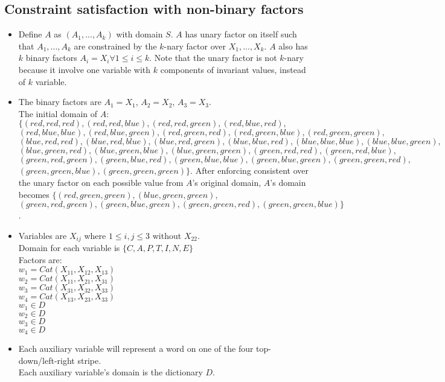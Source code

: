 \documentclass[11pt]{article}
\begin{document}
\begin{onehalfspace}
\section{Constraint satisfaction with non-binary factors}
\begin{itemize}
	\item
	Define $A$ as $(A_1,...,A_k)$ with domain $S$. $A$ has unary factor on itself such that $A_1,...,A_k$ are constrained by the $k$-nary factor over $X_1,...,X_k$. $A$ also has $k$ binary factors $A_i = X_i \forall 1 \leq i \leq k$. Note that the unary factor is not $k$-nary because it involve one variable with $k$ components of invariant values, instead of $k$ variable.\\
	\item
	 The binary factors are $A_1 = X_1$, $A_2 = X_2$, $A_3 = X_3$.\\
	 The initial domain of $A$: $\{(red,red,red),(red,red,blue),(red,red,green),(red,blue,red),$\\$(red,blue,blue),(red,blue,green),(red,green,red),(red,green,blue),(red,green,green),$\\$(blue,red,red),(blue,red,blue),(blue,red,green),(blue,blue,red),(blue,blue,blue),(blue,blue,green),$\\$(blue,green,red),(blue,green,blue),(blue,green,green),(green,red,red),(green,red,blue),$\\$(green,red,green),(green,blue,red),(green,blue,blue),(green,blue,green),(green,green,red),$\\$(green,green,blue),(green,green,green)\}$.
	 After enforcing consistent over the unary factor on each possible value from $A$'s original domain, $A$'s domain becomes $\{(red,green,green),(blue,green,green),$\\$(green,red,green),(green,blue,green),(green,green,red),(green,green,blue)\}$.
	 \item
	 Variables are $X_{ij}$ where $1 \leq i,j \leq 3$ without $X_{22}$.\\
	 Domain for each variable is $\{C,A,P,T,I,N,E\}$\\
	 Factors are:\\
	 $w_1 = Cat(X_{11},X_{12},X_{13})$\\
	 $w_2 = Cat(X_{11},X_{21},X_{31})$\\
	 $w_3 = Cat(X_{31},X_{32},X_{33})$\\
	 $w_4 = Cat(X_{13},X_{23},X_{33})$\\
	 $w_1 \in D$\\
	 $w_2 \in D$\\
	 $w_3 \in D$\\
	 $w_4 \in D$
	 \item
	 Each auxiliary variable will represent a word on one of the four top-down/left-right stripe.\\
	 Each auxiliary variable's domain is the dictionary $D$.
\end{itemize}

\end{onehalfspace}
\end{document}
